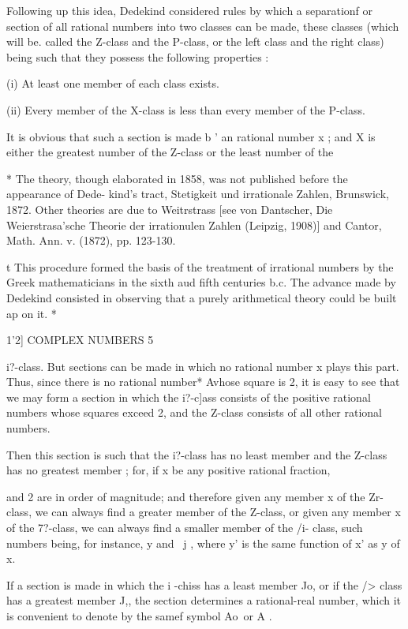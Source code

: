 Following up this idea, Dedekind considered rules by which a separationf 
or section of all rational numbers into two classes can be made, these classes 
(which will be. called the Z-class and the P-class, or the left class and the 
right class) being such that they possess the following properties : 

(i) At least one member of each class exists. 

(ii) Every member of the X-class is less than every member of the 
P-class. 

It is obvious that such a section is made b ' an   rational number x ; and 
X is either the greatest number of the Z-class or the least number of the 

* The theory, though elaborated in 1858, was not published before the appearance of Dede- 
kind's tract, Stetigkeit und irrationale Zahlen, Brunswick, 1872. Other theories are due to 
Weitrstrass [see von Dantscher, Die Weierstrasa'sche Theorie der irrationulen Zahlen (Leipzig, 
1908)] and Cantor, Math. Ann. v. (1872), pp. 123-130. 

t This procedure formed the basis of the treatment of irrational numbers by the Greek 
mathematicians in the sixth aud fifth centuries b.c. The advance made by Dedekind consisted in 
observing that a purely arithmetical theory could be built ap on it. * 



1'2] COMPLEX NUMBERS 5 

i?-class. But sections can be made in which no rational number x plays this 
part. Thus, since there is no rational number* Avhose square is 2, it is easy 
to see that we may form a section in which the i?-c]ass consists of the positive 
rational numbers whose squares exceed 2, and the Z-class consists of all 
other rational numbers. 

Then this section is such that the i?-class has no least member and the 
Z-class has no greatest member ; for, if x be any positive rational fraction, 

and 2 are in order of magnitude; and therefore given any member x of the 
Zr-class, we can always find a greater member of the Z-class, or given any 
member x of the 7?-class, we can always find a smaller member of the 
/i- class, such numbers being, for instance, y and \ j , where y' is the same 
function of x' as y of x. 

If a section is made in which the i -chiss has a least member Jo, or if the 
/> class has a greatest member J,, the section determines a rational-real 
number, which it is convenient to denote by the samef symbol Ao\  or A . 


